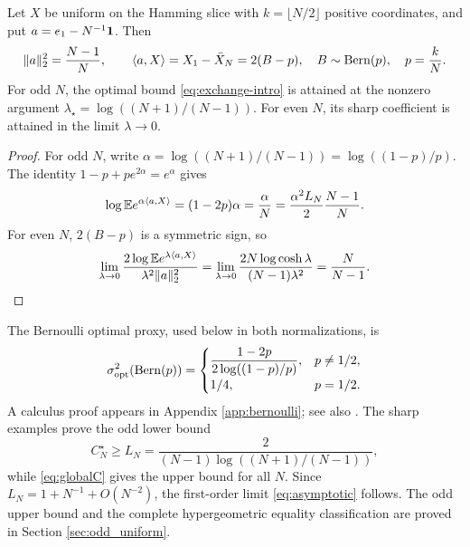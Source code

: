 \begin{proposition}\label{prop:explicit_extremizer}
Let $X$ be uniform on the Hamming slice with $k=\lfloor N/2\rfloor$ positive coordinates, and put $a=e_1-N^{-1}\mathbf1$. Then
\[
 \|a\|_2^2=\frac{N-1}{N},\qquad
 \langle a,X\rangle=X_1-\bar X_N=2(B-p),
 \quad B\sim\operatorname{Bern}(p),\quad p=\frac{k}{N}.
\]
For odd $N$, the optimal bound \eqref{eq:exchange-intro} is attained at the nonzero argument $\lambda_\star=\log((N+1)/(N-1))$. For even $N$, its sharp coefficient is attained in the limit $\lambda\to0$.
\end{proposition}
\begin{proof}
For odd $N$, write $\alpha=\log((N+1)/(N-1))=\log((1-p)/p)$. The identity $1-p+pe^{2\alpha}=e^\alpha$ gives
\[
 \log\mathbb E e^{\alpha\langle a,X\rangle}
 =(1-2p)\alpha=\frac\alpha N
 =\frac{\alpha^2 L_N}{2}\frac{N-1}{N}.
\]
For even $N$, $2(B-p)$ is a symmetric sign, so
\[
 \lim_{\lambda\to0}\frac{2\log\mathbb E e^{\lambda\langle a,X\rangle}}
 {\lambda^2\|a\|_2^2}
 =\lim_{\lambda\to0}\frac{2N\log\cosh\lambda}{(N-1)\lambda^2}
 =\frac{N}{N-1}.
\]
\end{proof}

The Bernoulli optimal proxy, used below in both normalizations, is
\begin{equation}\label{eq:bernproxy}
 \sigma^2_{\mathrm{opt}}(\operatorname{Bern}(p))=
 \begin{cases}\displaystyle\frac{1-2p}{2\log((1-p)/p)},&p\ne1/2,\\[5pt]1/4,&p=1/2.
 \end{cases}
\end{equation}
A calculus proof appears in Appendix \ref{app:bernoulli}; see also \cite{ArbelMarchalNguyen}. The sharp examples prove the odd lower bound
\begin{equation}\label{eq:oddL}
 C_N^\star\ge L_N=\frac{2}{(N-1)\log((N+1)/(N-1))},
\end{equation}
while \eqref{eq:globalC} gives the upper bound for all $N$. Since $L_N=1+N^{-1}+O(N^{-2})$, the first-order limit \eqref{eq:asymptotic} follows. The odd upper bound and the complete hypergeometric equality classification are proved in Section \ref{sec:odd_uniform}.
